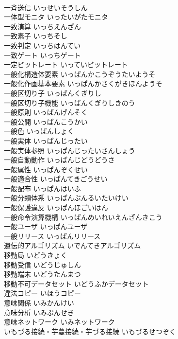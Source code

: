 \documentclass[8pt]{extreport}
\begin{document}
\begin{CJK}{UTF8}{min}
\\	一斉送信	いっせいそうしん	
\\	一体型モニタ	いったいがたモニタ	
\\	一致演算	いっちえんざん	
\\	一致素子	いっちそし	
\\	一致判定	いっちはんてい	
\\	一致ゲート	いっちゲート	
\\	一定ビットレート	いっていビットレート	
\\	一般化構造体要素	いっぱんかこうぞうたいようそ	
\\	一般化作画基本要素	いっぱんかさくがきほんようそ	
\\	一般区切り子	いっぱんくぎりし	
\\	一般区切り子機能	いっぱんくぎりしきのう	
\\	一般原則	いっぱんげんそく	
\\	一般公開	いっぱんこうかい	
\\	一般色	いっぱんしょく	
\\	一般実体	いっぱんじったい	
\\	一般実体参照	いっぱんじったいさんしょう	
\\	一般自動動作	いっぱんじどうどうさ	
\\	一般属性	いっぱんぞくせい	
\\	一般適合性	いっぱんてきごうせい	
\\	一般配布	いっぱんはいふ	
\\	一般分類体系	いっぱんぶんるいたいけい	
\\	一般保護違反	いっぱんほごいはん	
\\	一般命令演算機構	いっぱんめいれいえんざんきこう	
\\	一般ユーザ	いっぱんユーザ	
\\	一般リリース	いっぱんリリース	
\\	遺伝的アルゴリズム	いでんてきアルゴリズム	
\\	移動局	いどうきょく	
\\	移動受信	いどうじゅしん	
\\	移動端末	いどうたんまつ	
\\	移動不可データセット	いどうふかデータセット	
\\	違法コピー	いほうコピー	
\\	意味関係	いみかんけい	
\\	意味分析	いみぶんせき	
\\	意味ネットワーク	いみネットワーク	
\\	いもづる接続・芋蔓接続・芋づる接続	いもづるせつぞく	

\end{CJK}
\end{document}
